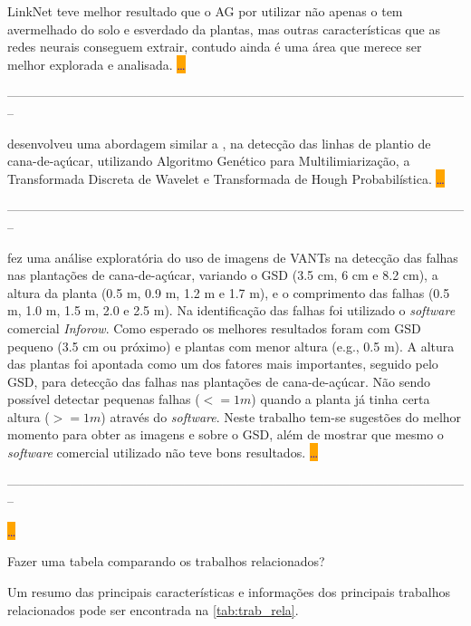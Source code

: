 \documentclass[12pt, a4paper, english, brazil]{article}
\newcommand{\textRed}[1]{{{\color{red} #1}}}
\newcommand{\dotsBlue}{\colorbox{orange}{\textcolor{blue}{\dots}}}
\newcommand{\linePage}{--------------------------------------------------------------------------------------------------------------}
\begin{document}
LinkNet teve melhor resultado que o AG por utilizar não apenas o tem avermelhado do solo e esverdado da plantas, mas outras características que as redes neurais conseguem extrair, \textRed{contudo ainda é uma área que merece ser melhor explorada e analisada.} \dotsBlue

\linePage

 desenvolveu uma abordagem similar a , na detecção das linhas de plantio de cana-de-açúcar, utilizando Algoritmo Genético para Multilimiarização, a Transformada
Discreta de Wavelet e Transformada de Hough Probabilística.
\dotsBlue

\linePage

 fez uma análise exploratória do uso de imagens de VANTs na detecção das falhas nas plantações de cana-de-açúcar, variando o GSD (3.5 cm, 6 cm e 8.2 cm), a altura da planta (0.5 m, 0.9 m, 1.2 m e 1.7 m), e o comprimento das falhas (0.5 m, 1.0 m, 1.5 m, 2.0 e 2.5 m). Na identificação das falhas foi utilizado o \textit{software} comercial \textit{Inforow}. Como esperado os melhores resultados foram com GSD pequeno (3.5 cm ou próximo) e plantas com menor altura (e.g., 0.5 m). A altura das plantas foi apontada como um dos fatores mais importantes, seguido pelo GSD, para detecção das falhas nas plantações de cana-de-açúcar. Não sendo possível detectar pequenas falhas  ($<= 1 m$) quando a planta já tinha certa altura ($ >= 1m $) através do \textit{software}. Neste trabalho tem-se sugestões do melhor momento para obter as imagens e sobre o GSD, além de \textRed{mostrar} que mesmo o \textit{software} comercial utilizado não teve bons resultados. \dotsBlue

\linePage

\dotsBlue

\textRed{Fazer uma tabela comparando os trabalhos relacionados?}

Um resumo das principais características e informações dos \textRed{principais} trabalhos relacionados pode ser encontrada na \autoref{tab:trab_rela}.
\end{document}
